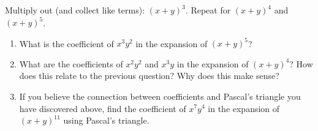 \documentclass{book}
\begin{document}
\setcounter{project}{67}
\addtocounter{project}{-1}
\begin{activity}[]\label{activity-60}
\hypertarget{p-527}{}%
Multiply out (and collect like terms): \((x+y)^3\).  Repeat for \((x+y)^4\) and \((x+y)^5\).%
\begin{enumerate}[font=\bfseries,label=(\alph*),ref=\alph*]
\item\label{task-88} \hypertarget{p-528}{}%
What is the coefficient of \(x^3y^2\) in the expansion of \((x+y)^5\)?%
\item\label{task-89} \hypertarget{p-529}{}%
What are the coefficients of \(x^2y^2\) and \(x^3y\) in the expansion of \((x+y)^4\)?  How does this relate to the previous question?  Why does this make sense?%
\item\label{task-90} \hypertarget{p-530}{}%
If you believe the connection between coefficients and Pascal's triangle you have discovered above, find the coefficient of \(x^7y^4\) in the expansion of \((x+y)^{11}\) using Pascal's triangle.%
\end{enumerate}
\end{activity}
\end{document}
